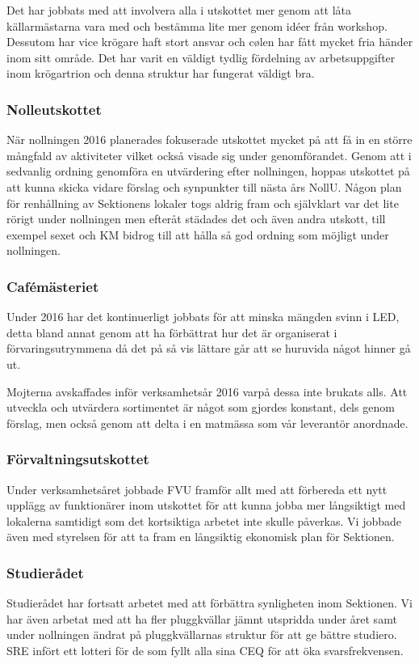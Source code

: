 \documentclass[../_main/handlingar.tex]{subfiles}
\begin{document}
Det har jobbats med att involvera alla i utskottet mer genom att låta källarmästarna vara med och bestämma lite mer genom idéer från workshop. Dessutom har vice krögare haft stort ansvar och cølen har fått mycket fria händer inom sitt område. Det har varit en väldigt tydlig fördelning av arbetsuppgifter inom krögartrion och denna struktur har fungerat väldigt bra.

\subsubsection*{Nolleutskottet}
När nollningen 2016 planerades fokuserade utskottet mycket på att få in en större mångfald av aktiviteter vilket också visade sig under genomförandet. Genom att i sedvanlig ordning genomföra en utvärdering efter nollningen, hoppas utskottet på att kunna skicka vidare förslag och synpunkter till nästa års NollU. Någon plan för renhållning av Sektionens lokaler togs aldrig fram och självklart var det lite rörigt under nollningen men efteråt städades det och även andra utskott, till exempel sexet och KM bidrog till att hålla så god ordning som möjligt under nollningen.

\subsubsection*{Cafémästeriet}
Under 2016 har det kontinuerligt jobbats för att minska mängden svinn i LED, detta bland annat genom att ha förbättrat hur det är organiserat i förvaringsutrymmena då det på så vis lättare går att se huruvida något hinner gå ut.

Mojterna avskaffades inför verksamhetsår 2016 varpå dessa inte brukats alls.
Att utveckla och utvärdera sortimentet är något som gjordes konstant, dels genom förslag, men också genom att delta i en matmässa som vår leverantör anordnade.

\subsubsection*{Förvaltningsutskottet}
Under verksamhetsåret jobbade FVU framför allt med att förbereda ett nytt upplägg av funktionärer inom utskottet för att kunna jobba mer långsiktigt med lokalerna samtidigt som det kortsiktiga arbetet inte skulle påverkas. Vi jobbade även med styrelsen för att ta fram en långsiktig ekonomisk plan för Sektionen.

\subsubsection*{Studierådet}
Studierådet har fortsatt arbetet med att förbättra synligheten inom Sektionen. Vi har även arbetat med att ha fler pluggkvällar jämnt utspridda under året samt under nollningen ändrat på pluggkvällarnas struktur för att ge bättre studiero. SRE infört ett lotteri för de som fyllt alla sina CEQ för att öka svarsfrekvensen.
\end{document}
